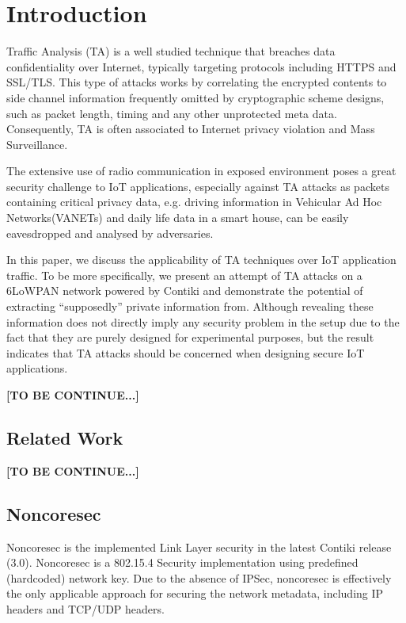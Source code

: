 \section{Introduction}
Traffic Analysis (TA) is a well studied technique that breaches data confidentiality over Internet, typically targeting protocols including HTTPS\cite{rfc2818} and SSL\cite{rfc6101}/TLS\cite{rfc5246}. This type of attacks works by correlating the encrypted contents to side channel information frequently omitted by cryptographic scheme designs, such as packet length, timing and any other unprotected meta data. Consequently, TA is often associated to Internet privacy violation and Mass Surveillance.

The extensive use of radio communication in exposed environment poses a great security challenge to IoT applications, especially against TA attacks as packets containing critical privacy data, e.g. driving information in Vehicular Ad Hoc Networks(VANETs)\cite{VANET} and daily life data in a smart house, can be easily eavesdropped and analysed by adversaries.

In this paper, we discuss the applicability of TA techniques over IoT application traffic. To be more specifically, we present an attempt of TA attacks on a 6LoWPAN\cite{rfc4944} network powered by Contiki\cite{Contiki} and demonstrate the potential of extracting ``supposedly'' private information from. Although revealing these information does not directly imply any security problem in the setup due to the fact that they are purely designed for experimental purposes, but the result indicates that TA attacks should be concerned when designing secure IoT applications.

\textbf{[TO BE CONTINUE...]}

\subsection{Related Work}
\textbf{[TO BE CONTINUE...]}

\subsection{Noncoresec}
Noncoresec\cite{noncoresec} is the implemented Link Layer\cite{OSI} security in the latest Contiki release (3.0). Noncoresec is a 802.15.4 Security\cite{802154} implementation using predefined (hardcoded) network key. Due to the absence of IPSec\cite{rfc4301}, noncoresec is effectively the only applicable approach for securing the network metadata, including IP headers and TCP/UDP headers.

